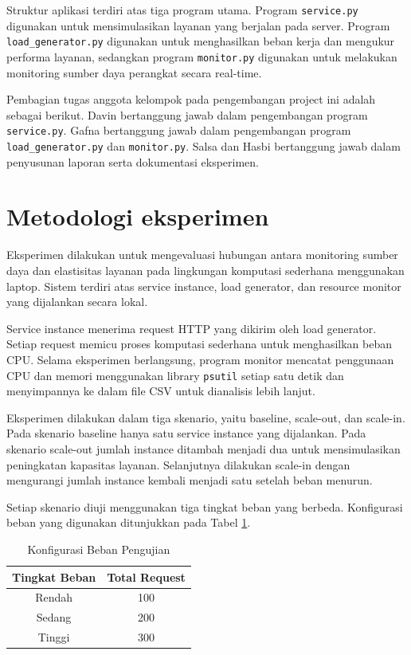 \documentclass[conference]{IEEEtran}
\begin{document}
Struktur aplikasi terdiri atas tiga program utama. Program
\texttt{service.py} digunakan untuk mensimulasikan layanan yang berjalan pada server. Program
\texttt{load\_generator.py} digunakan untuk menghasilkan beban kerja dan mengukur performa layanan, sedangkan program
\texttt{monitor.py} digunakan untuk melakukan monitoring sumber daya perangkat secara real-time.

Pembagian tugas anggota kelompok pada pengembangan project ini adalah sebagai berikut. Davin bertanggung jawab dalam pengembangan program \texttt{service.py}. Gafna bertanggung jawab dalam pengembangan program \texttt{load\_generator.py} dan \texttt{monitor.py}. Salsa dan Hasbi bertanggung jawab dalam penyusunan laporan serta dokumentasi eksperimen.

\section{Metodologi eksperimen}
Eksperimen dilakukan untuk mengevaluasi hubungan antara monitoring sumber daya dan elastisitas layanan pada lingkungan komputasi sederhana menggunakan laptop. Sistem terdiri atas service instance, load generator, dan resource monitor yang dijalankan secara lokal.

Service instance menerima request HTTP yang dikirim oleh load generator. Setiap request memicu proses komputasi sederhana untuk menghasilkan beban CPU. Selama eksperimen berlangsung, program monitor mencatat penggunaan CPU dan memori menggunakan library \texttt{psutil} setiap satu detik dan menyimpannya ke dalam file CSV untuk dianalisis lebih lanjut.

Eksperimen dilakukan dalam tiga skenario, yaitu baseline, scale-out, dan scale-in. Pada skenario baseline hanya satu service instance yang dijalankan. Pada skenario scale-out jumlah instance ditambah menjadi dua untuk mensimulasikan peningkatan kapasitas layanan. Selanjutnya dilakukan scale-in dengan mengurangi jumlah instance kembali menjadi satu setelah beban menurun.

Setiap skenario diuji menggunakan tiga tingkat beban yang berbeda. Konfigurasi beban yang digunakan ditunjukkan pada Tabel \ref{tab}.

\begin{table}[ht]
\centering
\caption{Konfigurasi Beban Pengujian}
\label{tab}
\begin{tabular}{|c|c|}
\hline
Tingkat Beban & Total Request \\
\hline
Rendah & 100 \\
Sedang & 200 \\
Tinggi & 300 \\
\hline
\end{tabular}
\end{table}
\end{document}
